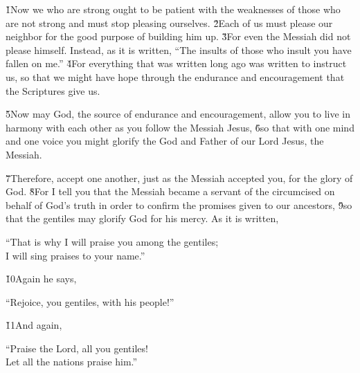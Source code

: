 \v{1}Now we who are strong ought to be patient with the weaknesses of those who are not strong and must stop pleasing ourselves. \v{2}Each of us must please our neighbor for the good purpose of building him up. \v{3}For even the Messiah did not please himself. Instead, as it is written, ``The insults of those who insult you have fallen on me.'' \v{4}For everything that was written long ago was written to instruct us, so that we might have hope through the endurance and encouragement that the Scriptures give us.

\v{5}Now may God, the source of endurance and encouragement, allow you to live in harmony with each other as you follow the Messiah Jesus, \v{6}so that with one mind and one voice you might glorify the God and Father of our Lord Jesus, the Messiah.

\v{7}Therefore, accept one another, just as the Messiah accepted you, for the glory of God. \v{8}For I tell you that the Messiah became a servant of the circumcised on behalf of God's truth in order to confirm the promises given to our ancestors, \v{9}so that the gentiles may glorify God for his mercy. As it is written,

\begin{poetry}
\poeml ``That is why I will praise you among the gentiles; \\
\poemll    I will sing praises to your name.''
\end{poetry}

\v{10}Again he says,

\begin{poetry}
\poeml ``Rejoice, you gentiles, with his people!''
\end{poetry}

\v{11}And again,

\begin{poetry}
\poeml ``Praise the Lord, all you gentiles! \\
\poemll    Let all the nations praise him.''
\end{poetry}

